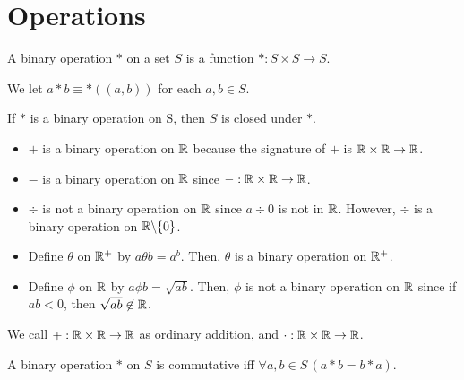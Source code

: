% 

\section{Operations}
    \begin{dfn}
        A binary operation \(*\) on a set \(S\) is a function \(* : S \times S \to S\).
    \end{dfn}

    We let \(a * b \equiv *((a, b))\) for each \(a, b\in S\).

    \begin{dfn}[Closure]
        If \(*\) is a binary operation on S, then \(S\) is closed under \(*\).
    \end{dfn}

    \begin{example}
        \mbox{}

        \begin{itemize}
            \item \(+\) is a binary operation on \(\mathbb{R}\) because the signature of \(+\) is \(\mathbb{R}\times\mathbb{R}\to\mathbb{R}\).
            \item \(-\) is a binary operation on \(\mathbb{R}\) since \(- : \mathbb{R}\times\mathbb{R} \to\mathbb{R}\).
            \item \(\div\) is not a binary operation on \(\mathbb{R}\) since \(a\div 0\) is not in \(\mathbb{R}\). However, \(\div\) is a binary operation on \(\mathbb{R} \backslash\{0\}\).
            \item Define \(\theta\) on \(\mathbb{R}^+\) by \(a\theta b = a^b\). Then, \(\theta\) is a binary operation on \(\mathbb{R}^+\).
            \item Define \(\phi\) on \(\mathbb{R}\) by \(a\phi b = \sqrt{ab}\). Then, \(\phi\) is not a binary operation on \(\mathbb{R}\) since if \(ab < 0\), then \(\sqrt{ab} \not\in\mathbb{R}\).
        \end{itemize}
    \end{example}

    \begin{note}
        We call \(+ : \mathbb{R}\times\mathbb{R}\to\mathbb{R}\) as ordinary addition, and \(\cdot : \mathbb{R}\times\mathbb{R}\to\mathbb{R}\).
    \end{note}

    \begin{dfn}
        A binary operation \(*\) on \(S\) is commutative iff \(\forall a,b\!\in\! S\, (a * b = b * a)\).
    \end{dfn}

